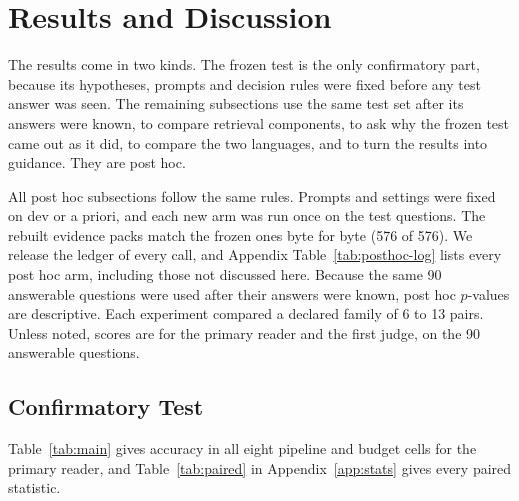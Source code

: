 \section{Results and Discussion}
\label{sec:results}
\label{sec:discussion}

The results come in two kinds. The frozen test is the only confirmatory part, because its hypotheses, prompts and decision rules were fixed before any test answer was seen. The remaining subsections use the same test set after its answers were known, to compare retrieval components, to ask why the frozen test came out as it did, to compare the two languages, and to turn the results into guidance. They are post hoc.

All post hoc subsections follow the same rules. Prompts and settings were fixed on dev or a priori, and each new arm was run once on the test questions. The rebuilt evidence packs match the frozen ones byte for byte (576 of 576). We release the ledger of every call, and Appendix Table~\ref{tab:posthoc-log} lists every post hoc arm, including those not discussed here. Because the same 90 answerable questions were used after their answers were known, post hoc $p$-values are descriptive. Each experiment compared a declared family of 6 to 13 pairs. Unless noted, scores are for the primary reader and the first judge, on the 90 answerable questions.

\subsection{Confirmatory Test}
\label{sec:frozen}
Table~\ref{tab:main} gives accuracy in all eight pipeline and budget cells for the primary reader, and Table~\ref{tab:paired} in Appendix~\ref{app:stats} gives every paired statistic.


